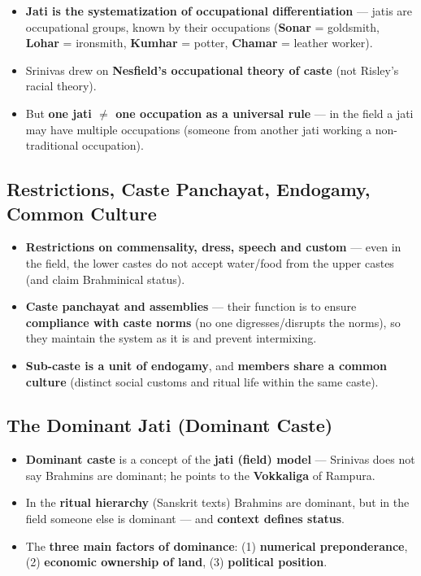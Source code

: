 \begin{KeyConcept}
\begin{itemize}
\item \textbf{Jati is the systematization of occupational differentiation} --- jatis are occupational groups, known by their occupations (\textbf{Sonar} = goldsmith, \textbf{Lohar} = ironsmith, \textbf{Kumhar} = potter, \textbf{Chamar} = leather worker).
\item Srinivas drew on \textbf{Nesfield's occupational theory of caste} (not Risley's racial theory).
\item But \textbf{one jati $\neq$ one occupation as a universal rule} --- in the field a jati may have multiple occupations (someone from another jati working a non-traditional occupation).
\end{itemize}
\end{KeyConcept}

\subsection{Restrictions, Caste Panchayat, Endogamy, Common Culture}

\begin{KeyConcept}
\begin{itemize}
\item \textbf{Restrictions on commensality, dress, speech and custom} --- even in the field, the lower castes do not accept water/food from the upper castes (and claim Brahminical status).
\item \textbf{Caste panchayat and assemblies} --- their function is to ensure \textbf{compliance with caste norms} (no one digresses/disrupts the norms), so they maintain the system as it is and prevent intermixing.
\item \textbf{Sub-caste is a unit of endogamy}, and \textbf{members share a common culture} (distinct social customs and ritual life within the same caste).
\end{itemize}
\end{KeyConcept}

\subsection{The Dominant Jati (Dominant Caste)}

\begin{KeyConcept}
\begin{itemize}
\item \textbf{Dominant caste} is a concept of the \textbf{jati (field) model} --- Srinivas does not say Brahmins are dominant; he points to the \textbf{Vokkaliga} of Rampura.
\item In the \textbf{ritual hierarchy} (Sanskrit texts) Brahmins are dominant, but in the field someone else is dominant --- and \textbf{context defines status}.
\item The \textbf{three main factors of dominance}: (1) \textbf{numerical preponderance}, (2) \textbf{economic ownership of land}, (3) \textbf{political position}.
\end{itemize}
\end{KeyConcept}

